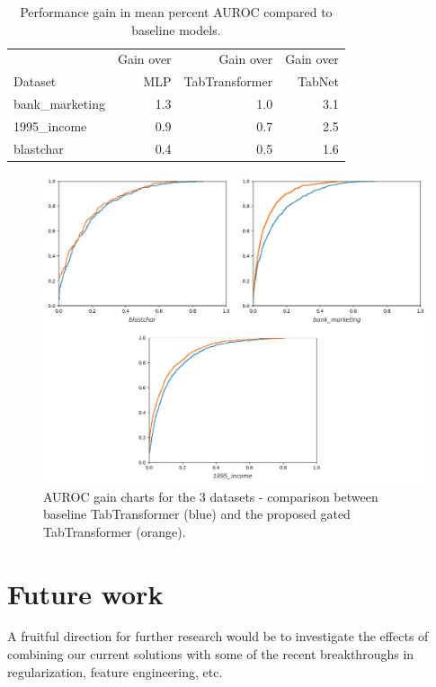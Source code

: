 \documentclass{article}
\begin{document}
\begin{table}[htp]
\caption{
	Performance gain in mean percent AUROC compared to baseline models.
}
\label{tab:results-gain}
\centering
	\begin{tabular}{lrrr}
		\toprule
		        & Gain over & Gain over         & Gain over \\
		Dataset & MLP       & TabTransformer    & TabNet \\
		\midrule
		bank\_marketing  & 1.3 & 1.0 & 3.1 \\
		1995\_income     & 0.9 & 0.7 & 2.5 \\
		blastchar        & 0.4 & 0.5 & 1.6 \\
		\bottomrule
    \end{tabular}
\end{table}

\begin{figure}[hpt]
  \begin{center}
      \includegraphics[width=12.5cm]{roc_comparison.png}
  \end{center}
  \caption{AUROC gain charts for the 3 datasets - comparison between baseline TabTransformer (\textcolor[rgb]{0.12,0.53,0.7}{blue}) and the proposed gated TabTransformer (\textcolor[rgb]{1,0.4,0}{orange}).}
  \label{fig:auc-results}
\end{figure}

\section{Future work}

A fruitful direction for further research would be to investigate the effects of combining our current solutions with some of the recent breakthroughs in regularization, feature engineering, etc.
\end{document}
